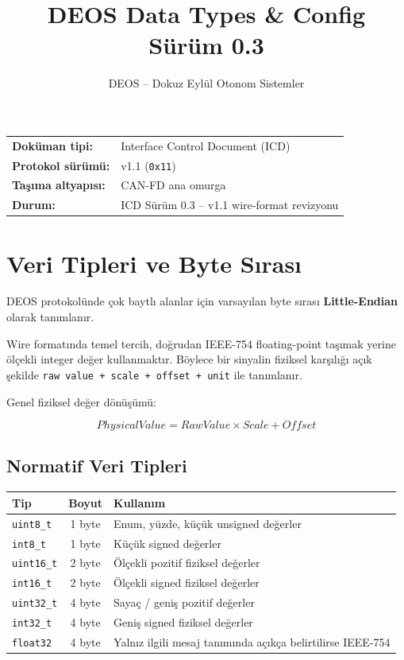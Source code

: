 \documentclass[a4paper,10pt]{article}
\title{\textbf{DEOS Data Types \& Config}\\
\large Sürüm 0.3}
\author{DEOS -- Dokuz Eylül Otonom Sistemler}
\date{}
\newcommand{\hex}[1]{\texttt{0x#1}}
\newcommand{\code}[1]{\texttt{#1}}
\begin{document}
\maketitle

\begin{center}
\begin{tabular}{ll}
\textbf{Doküman tipi:} & Interface Control Document (ICD) \\
\textbf{Protokol sürümü:} & v1.1 (\hex{11}) \\
\textbf{Taşıma altyapısı:} & CAN-FD ana omurga \\
\textbf{Durum:} & ICD Sürüm 0.3 -- v1.1 wire-format revizyonu \\
\end{tabular}
\end{center}


\section{Veri Tipleri ve Byte Sırası}

DEOS protokolünde çok baytlı alanlar için varsayılan byte sırası \textbf{Little-Endian}
olarak tanımlanır.

Wire formatında temel tercih, doğrudan IEEE-754 floating-point taşımak yerine ölçekli
integer değer kullanmaktır. Böylece bir sinyalin fiziksel karşılığı açık şekilde
\code{raw value + scale + offset + unit} ile tanımlanır.

Genel fiziksel değer dönüşümü:

\[
PhysicalValue = RawValue \times Scale + Offset
\]

\subsection{Normatif Veri Tipleri}

\begin{center}
\begin{tabularx}{\textwidth}{l c X}
\toprule
Tip & Boyut & Kullanım \\
\midrule
\code{uint8\_t}  & 1 byte & Enum, yüzde, küçük unsigned değerler \\
\code{int8\_t}   & 1 byte & Küçük signed değerler \\
\code{uint16\_t} & 2 byte & Ölçekli pozitif fiziksel değerler \\
\code{int16\_t}  & 2 byte & Ölçekli signed fiziksel değerler \\
\code{uint32\_t} & 4 byte & Sayaç / geniş pozitif değerler \\
\code{int32\_t}  & 4 byte & Geniş signed fiziksel değerler \\
\code{float32}   & 4 byte & Yalnız ilgili mesaj tanımında açıkça belirtilirse IEEE-754 \\
\bottomrule
\end{tabularx}
\end{center}
\end{document}
